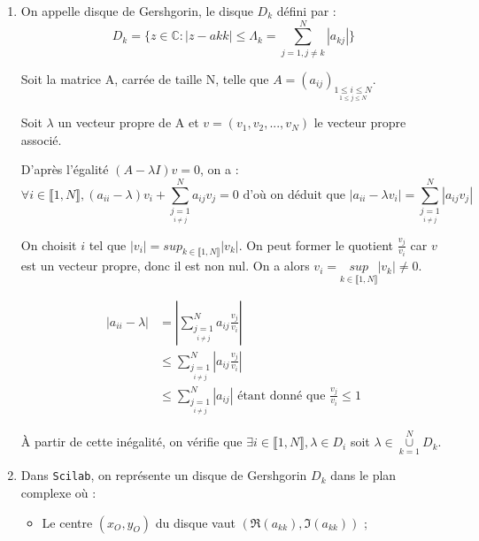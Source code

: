 \documentclass[a4paper,11pt]{article}
\newcommand{\C}{\mathbb{C}}
\theoremstyle{nonumberplain}
\theoremstyle{nonumberplain}
\theoremstyle{nonumberplain}
\begin{document}
    \begin{enumerate}
        \setlength\itemsep{2em}
        \item
        On appelle disque de Gershgorin, le disque $D_{k}$ défini par :
        $$D_{k} = \{ z \in \C : |z - a{kk}| \leq \Lambda_{k} = \sum\limits_{j=1, j\ne k}^{N} |a_{kj}| \}$$

        Soit la matrice A, carrée de taille N, telle que $A = (a_{ij})_{\underset {1 \leq j \leq N}{1 \leq i \leq N}}$.

        Soit $\lambda$ un vecteur propre de A et $v = (v_1, v_2, ..., v_N)$ le vecteur propre associé.

        D'après l'égalité $(A - \lambda I)v = 0$, on a :
        $$\forall i \in \llbracket 1 , N \rrbracket, (a_{ii} - \lambda)v_i + \sum\limits_{\underset{i \ne j}{j = 1}}^{N} a_{ij}v_j = 0 \text{ d'où on déduit que } |a_{ii} - \lambda v_{i}| = \sum\limits_{\underset{i \ne j}{j = 1}}^{N} |a_{ij}v_j|$$

        On choisit $i$ tel que $|v_{i}| = sup_{k \in \llbracket 1 , N \rrbracket} |v_{k}|$. On peut former le quotient $\frac{v_j}{v_{i}}$ car $v$ est un
        vecteur propre, donc il est non nul. On a alors $v_{i} = \underset{k \in \llbracket 1 , N \rrbracket}{sup} |v_{k}| \ne 0$.

        \begin{equation*}
            \begin{split}
                |a_{ii} - \lambda|  & = |\sum\limits_{\underset{i \ne j}{j = 1}}^{N} a_{ij} \frac{v_j}{v_{i}}| \\
                                    & \leq \sum\limits_{\underset{i \ne j}{j = 1}}^{N} |a_{ij} \frac{v_j}{v_{i}}| \\
                                    & \leq \sum\limits_{\underset{i \ne j}{j = 1}}^{N} |a_{ij}| \text{ étant donné que } \frac{v_j}{v_{i}} \leq 1
            \end{split}
        \end{equation*}

        \`{A} partir de cette inégalité, on vérifie que $\exists i \in \llbracket 1 , N \rrbracket,  \lambda \in D_{i}$ soit $\lambda \in \underset{k = 1}{\overset{N}{\cup}} D_{k}$.

        \item
        Dans \texttt{Scilab}, on représente un disque de Gershgorin $D_{k}$ dans le plan complexe où :
        \begin{itemize}
            \item
            Le centre $(x_{O}, y_{O})$ du disque vaut $(\Re(a_{kk}), \Im(a_{kk}))$ ;


\end{itemize}
\end{enumerate}
\end{document}
